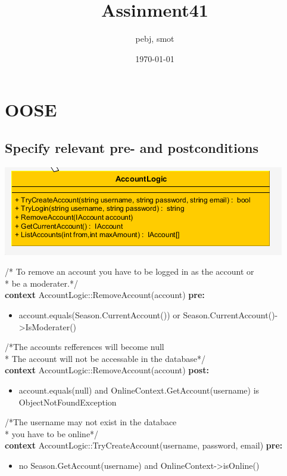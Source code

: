 \documentclass[a4paper]{article}
\title{Assinment41}
\author{pebj, smot}
\date{\today}
\begin{document}
\maketitle

\section{OOSE}

\subsection{Specify relevant pre- and postconditions}

\includegraphics[scale = 1]{AccountLogic.png}

\noindent
/* To remove an account you have to be logged in as the account or\\
* be a moderater.*/\\
\textbf{context} AccountLogic::RemoveAccount(account) \textbf{pre:}
\begin{itemize}[noitemsep,nolistsep]
\item[] account.equals(Season.CurrentAccount()) or
\subitem Season.CurrentAccount()->IsModerater()\\
\end{itemize}

\noindent
/*The accounts refferences will become null\\
* The account will not be accessable in the database*/\\
\textbf{context} AccountLogic::RemoveAccount(account) \textbf{post:}
\begin{itemize}[noitemsep,nolistsep]
\item[] account.equals(null) and
\subitem OnlineContext.GetAccount(username) is ObjectNotFoundException\\
\end{itemize}

\noindent
/*The username may not exist in the databace\\
* you have to be online*/\\
\textbf{context} AccountLogic::TryCreateAccount(username, password, email) \textbf{pre:}
\begin{itemize}[noitemsep,nolistsep]
\item[] no Season.GetAccount(username) and
\subitem OnlineContext->isOnline()\\
\end{itemize}
\end{document}
